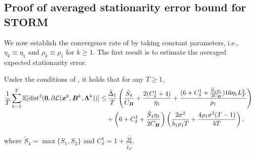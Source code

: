 \subsection{Proof of averaged stationarity error bound for STORM}
\label{subsubsec:proof-avg-stationarity-storm}
We now establish the convergence rate of  by taking constant parameters, i.e., $\eta_{k}\equiv \eta_{1}$ and $\rho_{k}\equiv \rho_{1}$ for $k \geq 1$. The first result is to estimate the averaged expected stationarity error.
\begin{lemma}
    \label{lemma: the averaged stationarity error bound} 
    Under the conditions of
     , it holds that for any $T \geq 1$,
    \begin{align}
    \frac{1}{T}\sum\limits_{ k =1}^{T} \mathbb{E} [\text{dist}^{2}(\bm{0}, \partial \mathcal{L}(\bm{x}^{k}, \bm{B}^{k}, \bm{\Lambda}^{k}))]        
        \leq & \, \frac{\tilde{\Delta}_{1}}{T}\left( \frac{\tilde{S}_{4}}{C_{\bm{B}}}+ \frac{2(C^1_{\delta}+ 4)}{\eta_{1}}+ \frac{(6+C^1_{\delta}+ \frac{\tilde{S}_4\eta_1}{2C_{\bm{B}}})16\eta_{1}L_{F}^{2}}{\rho_{1}}\right) \notag \\
        &+ \left( 6 + C^1_{\delta}+ \frac{\tilde{S}_{4}\eta_{1}}{2C_{\bm{B}}}\right)\left(\frac{2\sigma^{2}}{b_{1}\rho_{1}T}+ \frac{4\rho_{1}\sigma^{2}(T-1)}{bT}\right), \label{Eq: the averaged stationarity error bound in lemma}
    \end{align}
\end{lemma} where $\tilde{S}_4= \max\{S_{1}, S_{2}\}$ and $C^1_{\delta}= 1 + \frac{3\tilde{\delta}}{\tilde{L}_{F}^{2}}$.
